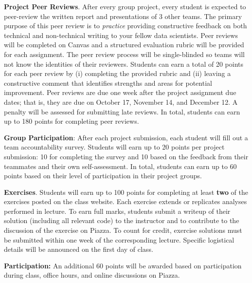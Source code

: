 \documentclass[11pt]{article}
\begin{document}
\textbf{Project Peer Reviews}. After every group project, every student is expected to peer-review the written report and presentations of 3 other teams. 
The primary purpose of this peer review is to \emph{practice} providing constructive feedback on both technical and non-technical writing to your fellow data scientists.
Peer reviews will be completed on Canvas and a structured evaluation rubric will be provided for each assignment. 
The peer review process will be single-blinded so teams will not know the identities of their reviewers.
Students can earn a total of 20 points for each peer review by (i) completing the provided rubric and (ii) leaving a constructive comment that identifies strengths and areas for potential improvement.
Peer reviews are due one week after the project assignment due dates; that is, they are due on October 17, November 14, and December 12.
A penalty will be assessed for submitting late reviews.
In total, students can earn up to 180 points for completing peer reviews. 

\textbf{Group Participation}: After each project submission, each student will fill out a team accountability survey.
Students will earn up to 20 points per project submission: 10 for completing the survey and 10 based on the feedback from their teammates and their own self-assessment. 
In total, students can earn up to 60 points based on their level of participation in their project groups.

\textbf{Exercises}. Students will earn up to 100 points for completing at least \textbf{two} of the exercises posted on the class website. Each exercise extends or replicates analyses performed in lecture. 
To earn full marks, students submit a writeup of their solution (including all relevant code) to the instructor and to contribute to the discussion of the exercise on Piazza. 
To count for credit, exercise solutions must be submitted within one week of the corresponding lecture. 
Specific logistical details will be announced on the first day of class.

\textbf{Participation:} An additional 60 points will be awarded based on participation during class, office hours, and online discussions on Piazza.
\end{document}
